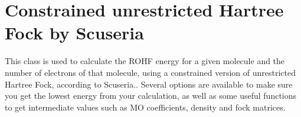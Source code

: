 \documentclass[letterpaper,10pt,english]{sphinxmanual}
\begin{document}
\label{\detokenize{cUHF_s:module-hf.HartreeFock.cUHF_s}}

\chapter{Constrained unrestricted Hartree Fock by Scuseria}
\label{\detokenize{cUHF_s:constrained-unrestricted-hartree-fock-by-scuseria}}\label{\detokenize{cUHF_s::doc}}
This class is used to calculate the ROHF energy for a given molecule and the number of electrons of that molecule,
using a constrained version of unrestricted Hartree Fock, according to Scuseria..
Several options are available to make sure you get the lowest energy from your calculation, as well as some useful
functions to get intermediate values such as MO coefficients, density and fock matrices.
\end{document}
